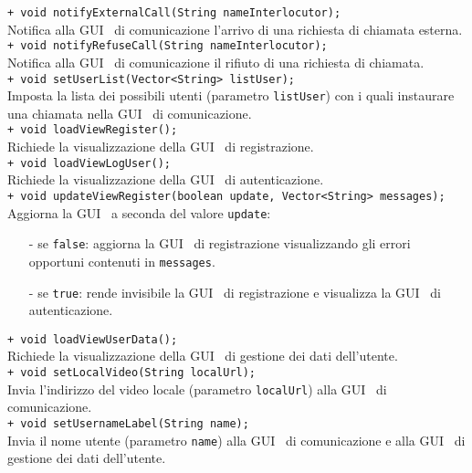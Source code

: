 {\begin{sloppypar}
{{\begin{itemize}
			\texttt{+ void notifyExternalCall(String nameInterlocutor);}\\
			Notifica alla GUI\g~ di comunicazione l'arrivo di una richiesta di chiamata esterna.\\
			
			\texttt{+ void notifyRefuseCall(String nameInterlocutor);}\\
			Notifica alla GUI\g~ di comunicazione il rifiuto di una richiesta di chiamata.\\
			
			\texttt{+ void setUserList(Vector<String> listUser);}\\
			Imposta la lista dei possibili utenti (parametro \texttt{listUser}) con i quali instaurare una chiamata nella GUI\g~ di comunicazione.\\

			\texttt{+ void loadViewRegister();}\\
			Richiede la visualizzazione della GUI\g~ di registrazione.\\

			\texttt{+ void loadViewLogUser();}\\
			Richiede  la visualizzazione della GUI\g~ di autenticazione.\\

			\texttt{+ void updateViewRegister(boolean update, Vector<String> messages);}\\
			Aggiorna la GUI\g~ a seconda del valore \texttt{update}:
			\begin{itemize}
				\item[-] se \texttt{false}: aggiorna la GUI\g~ di registrazione visualizzando gli errori opportuni contenuti in \texttt{messages}.
				\item[-] se \texttt{true}: rende invisibile la GUI\g~ di registrazione e visualizza la GUI\g~ di autenticazione.\\
			\end{itemize}

			\texttt{+ void loadViewUserData();}\\
			Richiede la visualizzazione della GUI\g~ di gestione dei dati dell'utente.\\

			\texttt{+ void setLocalVideo(String localUrl);}\\
			Invia l'indirizzo del video locale (parametro \texttt{localUrl}) alla GUI\g~ di comunicazione.\\

			\texttt{+ void setUsernameLabel(String name);}\\
			Invia il nome utente (parametro \texttt{name}) alla GUI\g~ di comunicazione e alla GUI\g~ di gestione dei dati dell'utente.\\


\end{itemize}}}
\end{sloppypar}}
